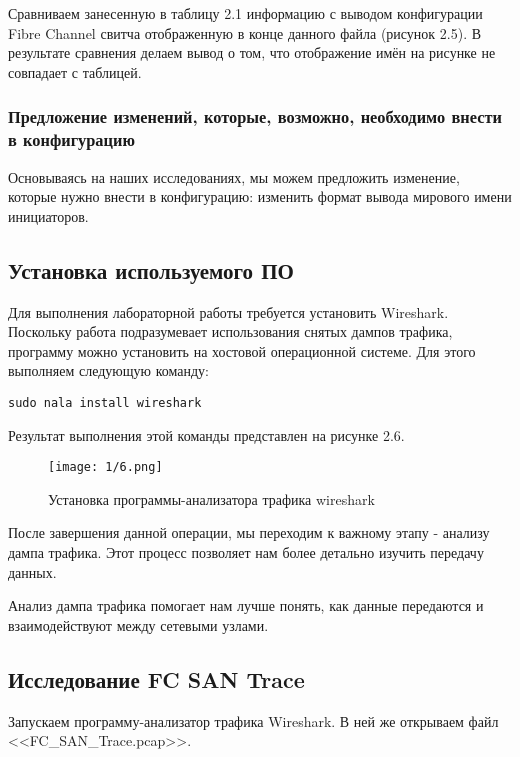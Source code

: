 Сравниваем занесенную в таблицу 2.1 информацию с выводом конфигурации Fibre
Channel свитча отображенную в конце данного файла (рисунок 2.5). В результате
сравнения делаем вывод о том, что отображение имён на рисунке не совпадает с
таблицей.

\subsubsection{Предложение изменений, которые, возможно, необходимо внести в
    конфигурацию}

Основываясь на наших исследованиях, мы можем предложить изменение, которые
нужно внести в конфигурацию: изменить формат вывода мирового имени инициаторов.

\subsection{Установка используемого ПО}

Для выполнения лабораторной работы требуется установить Wireshark. Поскольку
работа подразумевает использования снятых дампов трафика, программу можно
установить на хостовой операционной системе. Для этого выполняем следующую
команду:

\begin{lstlisting}
sudo nala install wireshark
\end{lstlisting}

Результат выполнения этой команды представлен на рисунке 2.6.

\begin{figure}[ht]
    \centering\texttt{[image: 1/6.png]}
    \caption{Установка программы-анализатора трафика wireshark}
\end{figure}

После завершения данной операции, мы переходим к важному этапу - анализу дампа
трафика. Этот процесс позволяет нам более детально изучить передачу данных.

Анализ дампа трафика помогает нам лучше понять, как данные передаются и
взаимодействуют между сетевыми узлами.

\subsection{Исследование FC SAN Trace}

Запускаем программу-анализатор трафика Wireshark. В ней же открываем файл
<<FC\_SAN\_Trace.pcap>>.

